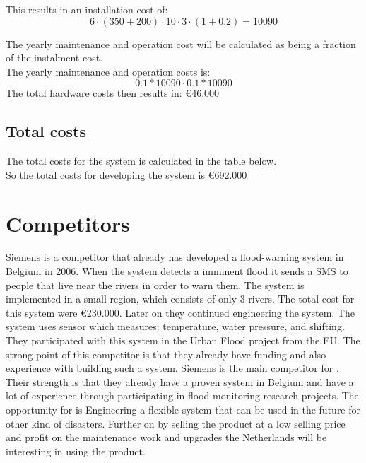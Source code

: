 This results in an installation cost of:
$$6\cdot(350+200)\cdot10\cdot3\cdot(1+0.2)=10090$$

The yearly maintenance and operation cost will be calculated as being a fraction of the instalment cost.\\
The yearly maintenance and operation costs is: 
$$0.1*10090\cdot0.1*10090$$ %
The total hardware costs then results in: \euro{}46.000

\subsection{Total costs}
The total costs for the system is calculated in the table below.\\
\newline
{}
So the total costs for developing the system is \euro{}692.000\\

\section{Competitors}
Siemens is a competitor that already has developed a flood-warning system in Belgium in 2006. When the system detects a imminent flood it sends a SMS to people that live near the rivers in order to warn them. The system is implemented in a small region, which consists of only 3 rivers. The total cost for this system were \euro{}230.000. Later on they continued engineering the system. The system uses sensor which measures: temperature, water pressure, and shifting. They participated with this system in the Urban Flood project from the EU. The strong point of this competitor is that they already have funding and also experience with building such a system. Siemens is the main competitor for \CompanyName{}. Their strength is that they already have a proven system in Belgium and have a lot of experience through participating in flood monitoring research projects. The opportunity for \CompanyName{} is Engineering a flexible system that can be used in the future for other kind of disasters. Further on by selling the product at a low selling price and profit on the maintenance work and upgrades the Netherlands will be interesting in using the product.

